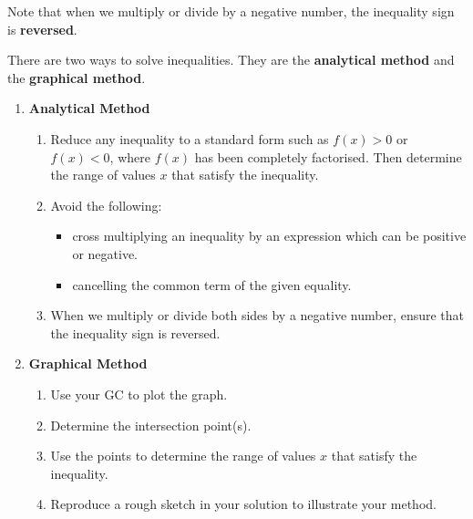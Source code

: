 \documentclass[11pt,a4paper]{book}
\begin{document}
Note that when we multiply or divide by a negative number, the inequality sign is \textbf{reversed}.

\medskip

There are two ways to solve inequalities. They are the \textbf{analytical
method} and the \textbf{graphical method}.


\begin{enumerate}[label=\textbf{(\alph*)}]

\item \textbf{Analytical Method}

\begin{enumerate}[label=(\roman*)]

\item Reduce any inequality to a standard form such as $f\left(x\right)>0$
or $f\left(x\right)<0$, where $f\left(x\right)$ has been completely
factorised. Then determine the range of values $x$ that satisfy the
inequality.

\item Avoid the following:
\begin{itemize}
\item cross multiplying an inequality by an expression which can be positive
or negative.
\item cancelling the common term of the given equality.
\end{itemize}
\item When we multiply or divide both sides by a negative number,
ensure that the inequality sign is reversed.

\end{enumerate}

\item \textbf{Graphical Method}

\begin{enumerate}[label=(\roman*)]

\item Use your GC to plot the graph.

\item Determine the intersection point(s).

\item Use the points to determine the range of values $x$ that satisfy
the inequality.

\item Reproduce a rough sketch in your solution to illustrate your
method.

\end{enumerate}

\end{enumerate}
\end{document}
